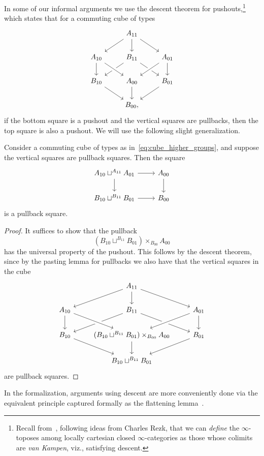 In some of our informal arguments we use the descent theorem for
pushouts,\footnote{Recall from~\cite[\S6.1.3]{Lurie09}, following
  ideas from Charles Rezk, that we can
  \emph{define} the $\infty$-toposes among locally cartesian closed
  $\infty$-categories as those whose colimits are \emph{van Kampen},
  viz., satisfying descent.}
which states that for a commuting cube of types
\begin{equation}\label{eq:cube_higher_groups}
\begin{tikzcd}
& A_{11} \arrow[dl] \arrow[dr] \arrow[d] \\
A_{10} \arrow[d] & B_{11} \arrow[dl] \arrow[dr] & A_{01} \arrow[dl,crossing over] \arrow[d] \\
B_{10} \arrow[dr] & A_{00} \arrow[d] \arrow[from=ul,crossing over] & B_{01} \arrow[dl] \\
& B_{00},
\end{tikzcd}
\end{equation}
if the bottom square is a pushout and the vertical squares are pullbacks, then the top square is also a pushout. We will use the following slight generalization.

\begin{thm}
Consider a commuting cube of types as in~\eqref{eq:cube_higher_groups}, and suppose the vertical squares are pullback squares.
Then the square
\begin{equation*}
\begin{tikzcd}
A_{10}\sqcup^{A_{11}} A_{01} \arrow[r] \arrow[d] & A_{00} \arrow[d] \\
B_{10}\sqcup^{B_{11}} B_{01} \arrow[r] & B_{00}
\end{tikzcd}
\end{equation*}
is a pullback square.
\end{thm}

\begin{proof}
It suffices to show that the pullback 
\begin{equation*}
(B_{10}\sqcup^{B_{11}} B_{01})\times_{B_{00}}A_{00}
\end{equation*}
has the universal property of the pushout. This follows by the descent theorem, since by the pasting lemma for pullbacks we also have that the vertical squares in the cube
\begin{equation*}
\begin{tikzcd}
& A_{11} \arrow[dl] \arrow[dr] \arrow[d] \\
A_{10} \arrow[d] & B_{11} \arrow[dl] \arrow[dr] & A_{01} \arrow[dl,crossing over] \arrow[d] \\
B_{10} \arrow[dr] & (B_{10}\sqcup^{B_{11}} B_{01})\times_{B_{00}}A_{00} \arrow[d] \arrow[from=ul,crossing over] & B_{01} \arrow[dl] \\
& B_{10}\sqcup^{B_{11}} B_{01}
\end{tikzcd}
\end{equation*}
are pullback squares.
\end{proof}
In the formalization, arguments using descent are more conveniently
done via the equivalent principle captured formally as the flattening
lemma~\cite[\S6.12]{hottbook}.

